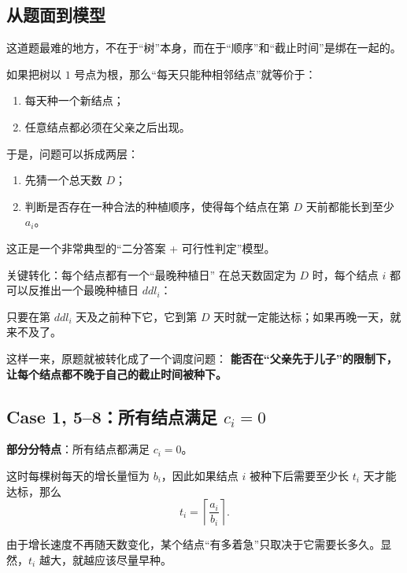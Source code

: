 \documentclass{book}
\begin{document}
\subsection{从题面到模型}

这道题最难的地方，不在于“树”本身，而在于“顺序”和“截止时间”是绑在一起的。

如果把树以 $1$ 号点为根，那么“每天只能种相邻结点”就等价于：

\begin{enumerate}[leftmargin=2em,itemsep=1pt,topsep=2pt,parsep=0pt,partopsep=0pt]
    \item 每天种一个新结点；
    \item 任意结点都必须在父亲之后出现。
\end{enumerate}

于是，问题可以拆成两层：

\begin{enumerate}[leftmargin=2em,itemsep=1pt,topsep=2pt,parsep=0pt,partopsep=0pt]
    \item 先猜一个总天数 $D$；
    \item 判断是否存在一种合法的种植顺序，使得每个结点在第 $D$ 天前都能长到至少 $a_i$。
\end{enumerate}

这正是一个非常典型的“二分答案 + 可行性判定”模型。

    \begin{keybox}{关键转化：每个结点都有一个“最晚种植日”}
        在总天数固定为 $D$ 时，每个结点 $i$ 都可以反推出一个最晚种植日 $ddl_i$：

        只要在第 $ddl_i$ 天及之前种下它，它到第 $D$ 天时就一定能达标；如果再晚一天，就来不及了。

        这样一来，原题就被转化成了一个调度问题：
        \textbf{能否在“父亲先于儿子”的限制下，让每个结点都不晚于自己的截止时间被种下。}
    \end{keybox}

\newpage
\subsection{Case 1, 5--8：所有结点满足 \texorpdfstring{$c_i=0$}{ci=0}}
    \textbf{部分分特点}：所有结点都满足 $c_i = 0$。

    这时每棵树每天的增长量恒为 $b_i$，因此如果结点 $i$ 被种下后需要至少长 $t_i$ 天才能达标，那么
    \[
    t_i = \left\lceil \frac{a_i}{b_i} \right\rceil.
    \]

    由于增长速度不再随天数变化，某个结点“有多着急”只取决于它需要长多久。显然，$t_i$ 越大，就越应该尽量早种。
\end{document}

